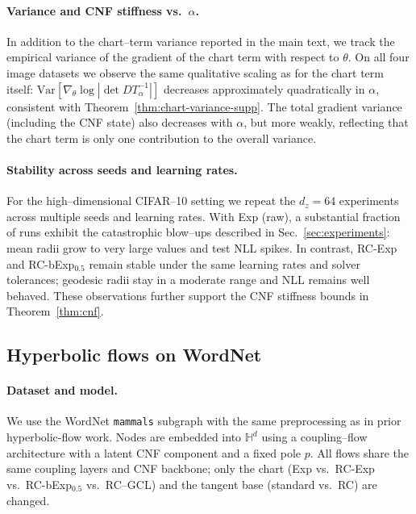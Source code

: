 \documentclass{article}
\theoremstyle{definition}
\theoremstyle{remark}
\newcommand{\HH}{\mathbb{H}}
\begin{document}
\paragraph{Variance and CNF stiffness vs.\ $\alpha$.}
In addition to the chart--term variance reported in the main text, we track the empirical
variance of the gradient of the chart term with respect to $\theta$.
On all four image datasets we observe the same qualitative scaling as for the chart term itself:
$\mathrm{Var}[\nabla_\theta \log|\det DT_\alpha^{-1}|]$ decreases approximately quadratically in
$\alpha$, consistent with Theorem~\ref{thm:chart-variance-supp}.
The total gradient variance (including the CNF state) also decreases with $\alpha$, but more
weakly, reflecting that the chart term is only one contribution to the overall variance.

\paragraph{Stability across seeds and learning rates.}
For the high--dimensional CIFAR--10 setting we repeat the $d_z=64$ experiments across
multiple seeds and learning rates.
With Exp (raw), a substantial fraction of runs exhibit the catastrophic blow--ups described in
Sec.~\ref{sec:experiments}: mean radii grow to very large values and test NLL spikes.
In contrast, RC-Exp and RC-bExp$_{0.5}$ remain stable under the same learning rates and
solver tolerances; geodesic radii stay in a moderate range and NLL remains well behaved.
These observations further support the CNF stiffness bounds in Theorem~\ref{thm:cnf}.

\subsection*{Hyperbolic flows on WordNet}
\label{app:E4_details}

\paragraph{Dataset and model.}
We use the WordNet \texttt{mammals} subgraph with the same preprocessing as in prior
hyperbolic-flow work.
Nodes are embedded into $\HH^d$ using a coupling--flow architecture with a latent CNF component
and a fixed pole $p$.
All flows share the same coupling layers and CNF backbone; only the chart
(Exp vs.\ RC-Exp vs.\ RC-bExp$_{0.5}$ vs.\ RC--GCL) and the tangent base
(standard vs.\ RC) are changed.
\end{document}
